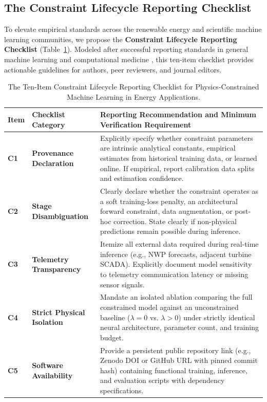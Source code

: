 \documentclass[preprint,3p,times]{elsarticle}
\begin{document}
\subsection{The Constraint Lifecycle Reporting Checklist}
To elevate empirical standards across the renewable energy and scientific machine learning communities, we propose the \textbf{Constraint Lifecycle Reporting Checklist} (Table~\ref{tab:checklist}). Modeled after successful reporting standards in general machine learning and computational medicine \cite{pineau2021,tricco2018}, this ten-item checklist provides actionable guidelines for authors, peer reviewers, and journal editors.

\begin{table}[t]
\centering
\small
\caption{The Ten-Item Constraint Lifecycle Reporting Checklist for Physics-Constrained Machine Learning in Energy Applications.}
\label{tab:checklist}
\begin{tabular}{lp{3.5cm}p{10.5cm}}
\toprule
\textbf{Item} & \textbf{Checklist Category} & \textbf{Reporting Recommendation and Minimum Verification Requirement} \\
\midrule
\textbf{C1} & \textbf{Provenance Declaration} & Explicitly specify whether constraint parameters are intrinsic analytical constants, empirical estimates from historical training data, or learned online. If empirical, report calibration data splits and estimation confidence. \\
\textbf{C2} & \textbf{Stage Disambiguation} & Clearly declare whether the constraint operates as a soft training-loss penalty, an architectural forward constraint, data augmentation, or post-hoc correction. State clearly if non-physical predictions remain possible during inference. \\
\textbf{C3} & \textbf{Telemetry Transparency} & Itemize all external data required during real-time inference (e.g., NWP forecasts, adjacent turbine SCADA). Explicitly document model sensitivity to telemetry communication latency or missing sensor signals. \\
\textbf{C4} & \textbf{Strict Physical Isolation} & Mandate an isolated ablation comparing the full constrained model against an unconstrained baseline ($\lambda=0$ vs. $\lambda > 0$) under strictly identical neural architecture, parameter count, and training budget. \\
\textbf{C5} & \textbf{Software Availability} & Provide a persistent public repository link (e.g., Zenodo DOI or GitHub URL with pinned commit hash) containing functional training, inference, and evaluation scripts with dependency specifications. \\

\end{tabular}
\end{table}
\end{document}
